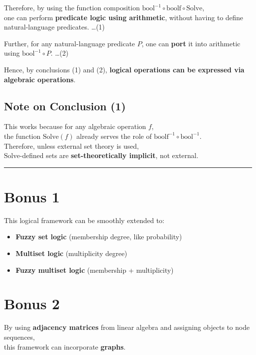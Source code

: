 \documentclass{article}
\begin{document}
Therefore, by using the function composition $\mathrm{bool}^{-1} \circ \mathrm{boolf} \circ \mathrm{Solve}$,\\
one can perform \textbf{predicate logic using arithmetic}, without having to define natural-language predicates. \dots (1)

Further, for any natural-language predicate $P$, one can \textbf{port} it into arithmetic using $\mathrm{bool}^{-1} \circ P$. \dots (2)

Hence, by conclusions (1) and (2), \textbf{logical operations can be expressed via algebraic operations}.

\bigskip

\subsection*{Note on Conclusion (1)}

This works because for any algebraic operation $f$,\\
the function $\mathrm{Solve}(f)$ already serves the role of $\mathrm{boolf}^{-1} \circ \mathrm{bool}^{-1}$.\\

Therefore, unless external set theory is used,\\
$\mathrm{Solve}$-defined sets are \textbf{set-theoretically implicit}, not external.

\bigskip
\hrule
\bigskip

\section*{Bonus 1}

This logical framework can be smoothly extended to:

\begin{itemize}
    \item \textbf{Fuzzy set logic} (membership degree, like probability)
    \item \textbf{Multiset logic} (multiplicity degree)
    \item \textbf{Fuzzy multiset logic} (membership + multiplicity)
\end{itemize}

\bigskip

\section*{Bonus 2}

By using \textbf{adjacency matrices} from linear algebra and assigning objects to node sequences,\\
this framework can incorporate \textbf{graphs}.
\end{document}

